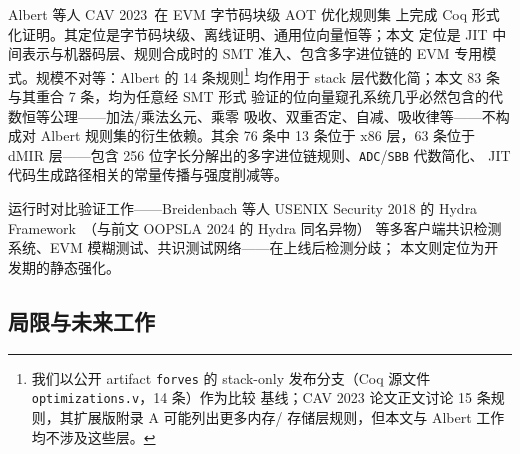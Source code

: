 Albert 等人 CAV 2023~\cite{verified_evm_cav23}在 EVM 字节码块级 AOT 优化规则集
上完成 Coq 形式化证明。其定位是字节码块级、离线证明、通用位向量恒等；本文
定位是 JIT 中间表示与机器码层、规则合成时的 SMT 准入、包含多字进位链的
EVM 专用模式。规模不对等：Albert 的 14 条规则\footnote{我们以公开 artifact \texttt{forves} 的
stack-only 发布分支（Coq 源文件 \texttt{optimizations.v}，14 条）作为比较
基线；CAV 2023 论文正文讨论 15 条规则，其扩展版附录 A 可能列出更多内存/
存储层规则，但本文与 Albert 工作均不涉及这些层。}
均作用于 stack 层代数化简；本文 83 条与其重合 7 条，均为任意经 SMT 形式
验证的位向量窥孔系统几乎必然包含的代数恒等公理——加法/乘法幺元、乘零
吸收、双重否定、自减、吸收律等——不构成对 Albert 规则集的衍生依赖。其余 76 条中 13 条位于 x86 层，63 条位于 dMIR 层——包含
256 位字长分解出的多字进位链规则、\texttt{ADC}/\texttt{SBB} 代数简化、
JIT 代码生成路径相关的常量传播与强度削减等。

运行时对比验证工作——Breidenbach 等人 USENIX Security 2018 的 Hydra
Framework~\cite{hydra_framework}（与前文 OOPSLA 2024 的 Hydra 同名异物）
等多客户端共识检测系统、EVM 模糊测试、共识测试网络——在上线后检测分歧；
本文则定位为开发期的静态强化。

\subsection{局限与未来工作}
\label{sec:limitations}

